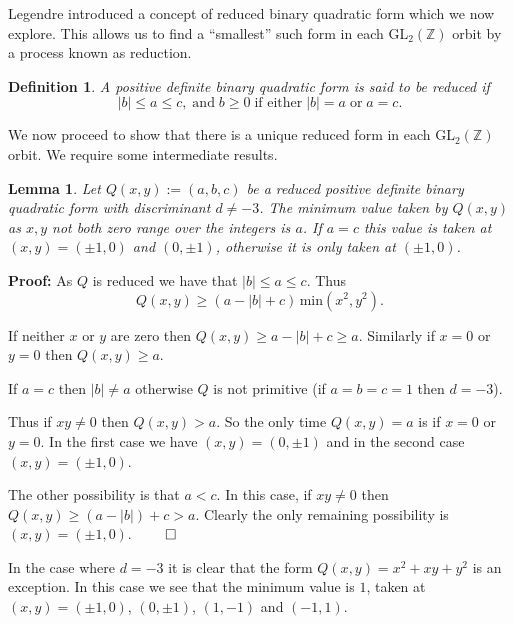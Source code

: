 \documentclass[a4paper,10pt]{amsart}
\newtheorem{lemma}[theorem]{Lemma}
\newtheorem{definition}[theorem]{Definition}
\begin{document}
Legendre introduced a concept of reduced binary quadratic form which we now explore. This allows us to find a ``smallest'' such form in each GL$_2(\mathbb{Z})$ orbit by a process known as reduction.

\begin{definition}A positive definite binary quadratic form is said to be \emph{reduced} if 
\begin{equation}\label{reduced}
|b| \leq a \leq c, \;\mbox{and}\; b \geq 0 \;\mbox{if either}\; |b| = a \;\mbox{or}\; a = c.
\end{equation}
\end{definition}

We now proceed to show that there is a unique reduced form in each GL$_2(\mathbb{Z})$ orbit. We require some intermediate results.

\begin{lemma}
Let $Q(x, y) := (a, b, c)$ be a reduced positive definite binary quadratic form with discriminant $d \neq -3$. The minimum value taken by $Q(x, y)$ as $x, y$ not both zero range over the integers is $a$. If $a = c$ this value is taken at $(x, y) = (\pm 1, 0)$ and $(0, \pm 1)$, otherwise it is only taken at $(\pm 1, 0)$.
\end{lemma}

\textbf{Proof:} As $Q$ is reduced we have that $|b| \leq a \leq c$. Thus 
\begin{equation}
Q(x, y) \geq (a - |b| + c)\,\mbox{min}(x^2, y^2).
\end{equation}

If neither $x$ or $y$ are zero then $Q(x, y) \geq a - |b| + c \geq a$. Similarly if $x = 0$ or $y = 0$ then $Q(x, y) \geq a$. 

If $a = c$ then $|b| \neq a$ otherwise $Q$ is not primitive (if $a = b = c = 1$ then $d = -3$).

Thus if $xy \neq 0$ then $Q(x, y) > a$. So the only time $Q(x, y) = a$ is if $x = 0$ or $y = 0$. In the first case we have $(x, y) = (0, \pm 1)$ and in the second case $(x, y) = (\pm 1, 0)$. 

The other possibility is that $a < c$. In this case, if $xy \neq 0$ then $Q(x, y) \geq (a - |b|) + c > a$. Clearly the only remaining possibility is $(x, y) = (\pm 1, 0)$. $\qed$

In the case where $d = -3$ it is clear that the form $Q(x, y) = x^2 + xy + y^2$ is an exception. In this case we see that the minimum value is $1$, taken at $(x, y) = (\pm 1, 0)$, $(0, \pm 1)$, $(1, -1)$ and $(-1, 1)$. 
 
\end{document}
